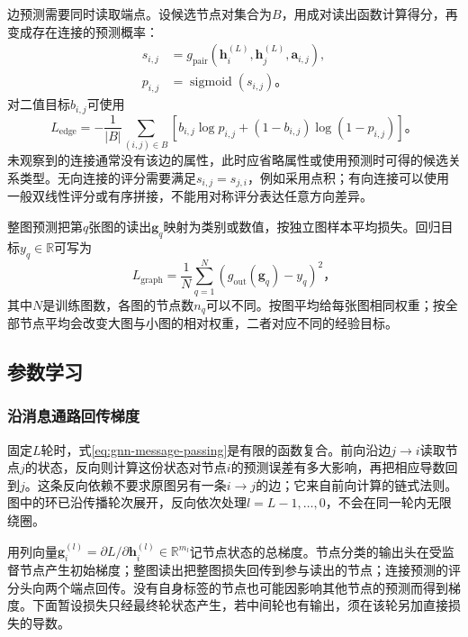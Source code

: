 边预测需要同时读取端点。设候选节点对集合为$B$，用成对读出函数计算得分，再变成存在连接的预测概率：
\[
  \begin{aligned}
    s_{i,j}&=g_{\mathrm{pair}}(\bm{h}_i^{(L)},\bm{h}_j^{(L)},\bm{a}_{i,j}),\\
    p_{i,j}&=\operatorname{sigmoid}(s_{i,j})\text{。}
  \end{aligned}
\]
对二值目标$b_{i,j}$可使用
\begin{equation}
  L_{\mathrm{edge}}=-\frac{1}{|B|}\sum_{(i,j)\in B}
    \left[b_{i,j}\log p_{i,j}+(1-b_{i,j})\log(1-p_{i,j})\right]\text{。}
  \label{eq:gnn-edge-loss}
\end{equation}
未观察到的连接通常没有该边的属性，此时应省略属性或使用预测时可得的候选关系类型。无向连接的评分需要满足$s_{i,j}=s_{j,i}$，例如采用点积；有向连接可以使用一般双线性评分或有序拼接，不能用对称评分表达任意方向差异。

整图预测把第$q$张图的读出$\bm{g}_q$映射为类别或数值，按独立图样本平均损失。回归目标$y_q\in\mathbb{R}$可写为
\begin{equation}
  L_{\mathrm{graph}}=\frac{1}{N}\sum_{q=1}^{N}
    \left(g_{\mathrm{out}}(\bm{g}_q)-y_q\right)^2\text{，}
  \label{eq:gnn-graph-loss}
\end{equation}
其中$N$是训练图数，各图的节点数$n_q$可以不同。按图平均给每张图相同权重；按全部节点平均会改变大图与小图的相对权重，二者对应不同的经验目标。

\subsection{参数学习}
\label{sec:gnn-learning}

\subsubsection{沿消息通路回传梯度}
\label{sec:gnn-message-backprop}

固定$L$轮时，式\eqref{eq:gnn-message-passing}是有限的函数复合。前向沿边$j\to i$读取节点$j$的状态，反向则计算这份状态对节点$i$的预测误差有多大影响，再把相应导数回到$j$。这条反向依赖不要求原图另有一条$i\to j$的边；它来自前向计算的链式法则。图中的环已沿传播轮次展开，反向依次处理$l=L-1,\ldots,0$，不会在同一轮内无限绕圈。

用列向量$\bm{g}_i^{(l)}=\partial L/\partial\bm{h}_i^{(l)}\in\mathbb{R}^{m_l}$记节点状态的总梯度。节点分类的输出头在受监督节点产生初始梯度；整图读出把整图损失回传到参与读出的节点；连接预测的评分头向两个端点回传。没有自身标签的节点也可能因影响其他节点的预测而得到梯度。下面暂设损失只经最终轮状态产生，若中间轮也有输出，须在该轮另加直接损失的导数。

